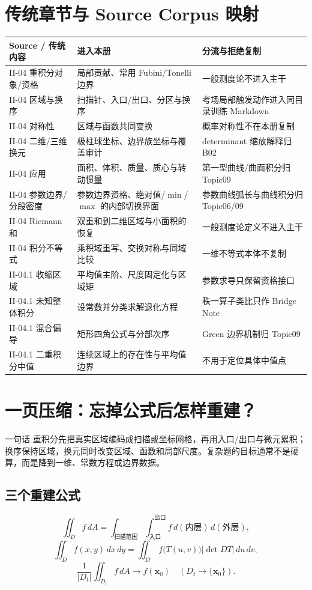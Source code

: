 \documentclass[11pt,a4paper,fontset=fandol]{ctexart}
\begin{document}
\section{传统章节与 Source Corpus 映射}
\begin{longtable}{L{2.65cm}L{5.25cm}L{\dimexpr\linewidth-7.90cm\relax}}
\toprule
\textbf{Source / 传统内容} & \textbf{进入本册} & \textbf{分流与拒绝复制}\\
\midrule
II-04 重积分对象/资格 & 局部贡献、常用 Fubini/Tonelli 边界 & 一般测度论不进入主干\\
II-04 区域与换序 & 扫描针、入口/出口、分区与换序 & 考场局部触发动作进入同目录训练 Markdown\\
II-04 对称性 & 区域与函数共同变换 & 概率对称性不在本册复制\\
II-04 二维/三维换元 & 极柱球坐标、边界族坐标与覆盖审计 & determinant 缩放解释归 B02\\
II-04 应用 & 面积、体积、质量、质心与转动惯量 & 第一型曲线/曲面积分归 Topic09\\
II-04 参数边界/分段密度 & 参数边界资格、绝对值/$\min$/$\max$ 的内部切换界面 & 参数曲线弧长与曲线积分归 Topic06/09\\
II-04 Riemann 和 & 双重和到二维区域与小面积的恢复 & 一般测度论定义不进入主干\\
II-04 积分不等式 & 乘积域重写、交换对称与同域比较 & 一维不等式本体不复制\\
II-04.1 收缩区域 & 平均值主阶、尺度固定化与区域矩 & 参数求导只保留资格接口\\
II-04.1 未知整体积分 & 设常数并分类求解退化方程 & 秩一算子类比只作 Bridge Note\\
II-04.1 混合偏导 & 矩形四角公式与分部次序 & Green 边界机制归 Topic09\\
II-04.1 二重积分中值 & 连续区域上的存在性与平均值边界 & 不用于定位具体中值点\\
\bottomrule
\end{longtable}

\section{一页压缩：忘掉公式后怎样重建？}
\begin{corebox}{一句话}
重积分先把真实区域编码成扫描或坐标网格，再用入口/出口与微元累积；换序保持区域，换元同时改变区域、函数和局部尺度。复杂题的目标通常不是硬算，而是降到一维、常数方程或边界数据。
\end{corebox}

\subsection{三个重建公式}
\[
\iint_D f\,dA
=\int_{\text{扫描范围}}
\int_{\text{入口}}^{\text{出口}}f\,d(\text{内层})\,d(\text{外层}),
\]
\[
\iint_D f(x,y)\,dx\,dy
=\iint_{D'}f\bigl(T(u,v)\bigr)\lvert\det DT\rvert\,du\,dv,
\]
\[
\frac1{\lvert D_t\rvert}\iint_{D_t}f\,dA\to f(\mathbf x_0)
\quad(D_t\to\{\mathbf x_0\}).
\]
\end{document}
